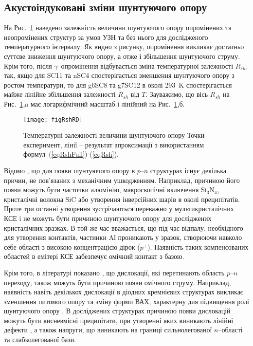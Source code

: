 \subsection{Акустоіндуковані зміни шунтуючого опору\label{sbRsh}}

На Рис.~\ref{figRshRD} наведено залежність величини шунтуючого опору опромінених та неопромінених структур
за умов УЗН та без нього для дослідженого температурного інтервалу.
Як видно з рисунку, опромінення викликає достатньо суттєве зниження шунтуючого опору, а отже
і збільшення шунтуючого струму.
Крім того, після $\gamma$--опромінення відбувається зміна температурної залежності $R_{sh}$:
так, якщо для SC11 та nSC4 спостерігається зменшення шунтуючого опору з ростом температури,
то для g6SC8 та g7SC12 в околі 293~K спостерігається майже лінійне збільшення залежності
$R_{sh}$ від $T$.
Зауважимо, що вісь $R_{sh}$ на Рис.~\ref{figRshRD},a має логарифмічний масштаб і лінійний на  Рис.~\ref{figRshRD},б.


\begin{figure}
\center
\texttt{[image: figRshRD]}
\caption{\label{figRshRD}
Температурні залежності величини шунтуючого опору
\FigCaptionSSCRD
Точки --- експеримент,
лінії -- результат апроксимації з використанням формул~(\ref{eqRshFull})-(\ref{eqRsh}).
}%
\end{figure}

Відомо \cite{Rsh:Breitenstein,RshMet,Breitenstein2013}, що для появи шунтуючого опору в $p$--$n$ структурах існує декілька причин, не
пов'язаних з механічним ушкодженням.
Наприклад, причиною його появи можуть бути часточки алюмінію, макроскопічні включення Si$_3$N$_4$, кристалічні волокна SiC або утворення інверсійних шарів
в околі преципітатів.
Проте три  останні утворення зустрічаються переважно у мультикристалічних КСЕ \cite{Rsh:Breitenstein,Breitenstein2013} і не можуть
бути причиною шунтуючого опору для досліджених кристалічних зразках.
В той же час вважається, що під час відпалу, необхідного для утворення контактів, частинки Al проникають у зразок,
створюючи навколо себе області з високою концентрацією дірок ($p^+$).
Наявність таких компенсованих областей в емітері КСЕ  забезпечує омічний контакт з базою.

Крім того, в літературі показано \cite{Rsh:Breitenstein,TAT:Gopal,Rsh:Baker,Si:dislIV},
що дислокації, які перетинають область $p$--$n$ переходу, також можуть бути причиною появи омічного струму.
Наприклад, наявність навіть декількох дислокації в діодних кремнієвих структурах викликає зменшення питомого опору
та зміну форми ВАХ, характерну для підвищення ролі шунтуючого опору \cite{Si:dislIV}.
В досліджених структурах причиною появи дислокацій можуть бути кисневмісні преципітати, при утворенні яких
виникають лінійні дефекти \cite{SiO:Hwang,SiO:Vanhell}, а також напруги, що виникають
на границі сильнолегованої $n$--області та слабколегованої бази.

